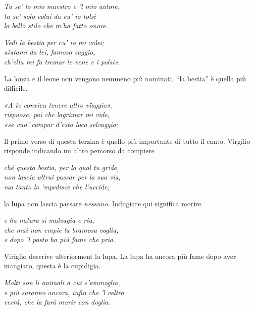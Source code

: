 \documentclass[a4paper]{article}
\newcommand{\quotes}[1]{``#1''}
\newcommand\hr{\par\vspace{-.5\ht\strutbox}\noindent\hrulefill\par\vspace{0.15cm}}
\begin{document}
\begin{center}
    \textit{Tu se' lo mio maestro e 'l mio autore,} \\
    \textit{tu se' solo colui da cu' io tolsi} \\
    \textit{lo bello stilo che m'ha fatto onore.}
\end{center}

\hr

\begin{center}
    \textit{Vedi la bestia per cu' io mi volsi;} \\
    \textit{aiutami da lei, famoso saggio,} \\
    \textit{ch'ella mi fa tremar le vene e i polsi».}
\end{center}

La lonza e il leone non vengono nemmeno più nominati, \quotes{la bestia} è quella più difficile.

\begin{center}
    \textit{«A te convien tenere altro vïaggio»,} \\
    \textit{rispuose, poi che lagrimar mi vide,} \\
    \textit{«se vuo' campar d'esto loco selvaggio;}
\end{center}

Il primo verso di questa terzina è quello più importante di tutto il canto.
Virgilio risponde indicando un altro percorso da compiere

\begin{center}
    \textit{ché questa bestia, per la qual tu gride,} \\
    \textit{non lascia altrui passar per la sua via,} \\
    \textit{ma tanto lo 'mpedisce che l'uccide;}
\end{center}

la lupa non lascia passare \textit{nessuno}.
Indugiare qui significa morire.

\begin{center}
    \textit{e ha natura sì malvagia e ria,} \\
    \textit{che mai non empie la bramosa voglia,} \\
    \textit{e dopo 'l pasto ha più fame che pria.}
\end{center}

Viriglio descrive ulteriorment la lupa.
La lupa ha ancora più fame dopo aver mangiato, questa è la cupidigia.

\begin{center}
    \textit{Molti son li animali a cui s'ammoglia,} \\
    \textit{e più saranno ancora, infin che 'l veltro} \\
    \textit{verrà, che la farà morir con doglia.}
\end{center}
\end{document}
